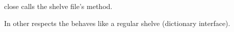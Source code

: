 \documentclass{howto}
\begin{document}
\begin{funcdesc}{close}{}
  calls the shelve file's  method.
\end{funcdesc}
In other respects the  behaves like a regular shelve
(dictionary interface).








%
%
\end{document}
